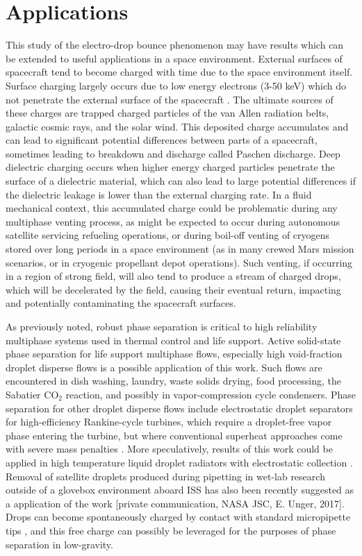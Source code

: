 \documentclass[12pt,a4paper,oneside]{book}
\begin{document}
\section{Applications}
This study of the electro-drop bounce phenomenon may have results which can be extended to useful applications in a space environment. External surfaces of spacecraft tend to become charged with time due to the space environment itself. Surface charging largely occurs due to low energy electrons (3-50 keV) which do not penetrate the external surface of the spacecraft \cite{czepiela_charging_1997}. The ultimate sources of these charges are trapped charged particles of the van Allen radiation belts, galactic cosmic rays, and the solar wind. This deposited charge accumulates and can lead to significant potential differences between parts of a spacecraft, sometimes leading to breakdown and discharge called Paschen discharge. Deep dielectric charging occurs when higher energy charged particles penetrate the surface of a dielectric material, which can also lead to large potential differences if the dielectric leakage is lower than the external charging rate. In a fluid mechanical context, this accumulated charge could be problematic during any multiphase venting process, as might be expected to occur during autonomous satellite servicing refueling operations, or during boil-off venting of cryogens stored over long periods in a space environment (as in many crewed Mars mission scenarios, or in cryogenic propellant depot operations). Such venting, if occurring in a region of strong field, will also tend to produce a stream of charged drops, which will be decelerated by the field, causing their eventual return, impacting and potentially contaminating the spacecraft surfaces.

As previously noted, robust phase separation is critical to high reliability multiphase systems used in thermal control and life support. Active solid-state phase separation for life support multiphase flows, especially high void-fraction droplet disperse flows is a possible application of this work. Such flows are encountered in dish washing, laundry, waste solids drying, food processing, the Sabatier CO$_2$ reaction, and possibly in vapor-compression cycle condensers. Phase separation for other droplet disperse flows include electrostatic droplet separators for high-efficiency Rankine-cycle turbines, which require a droplet-free vapor phase entering the turbine, but where conventional superheat approaches come with severe mass penalties \cite{unterberg_zero_1962}. More speculatively, results of this work could be applied in high temperature liquid droplet radiators with electrostatic collection \cite{white_liquid_1987}. Removal of satellite droplets produced during pipetting in wet-lab research outside of a glovebox environment aboard ISS has also been recently suggested as a application of the work [private communication, NASA JSC, E. Unger, 2017]. Drops can become spontaneously charged by contact with standard micropipette tips \cite{choi_spontaneous_2013}, and this free charge can possibly be leveraged for the purposes of phase separation in low-gravity. 
\end{document}
